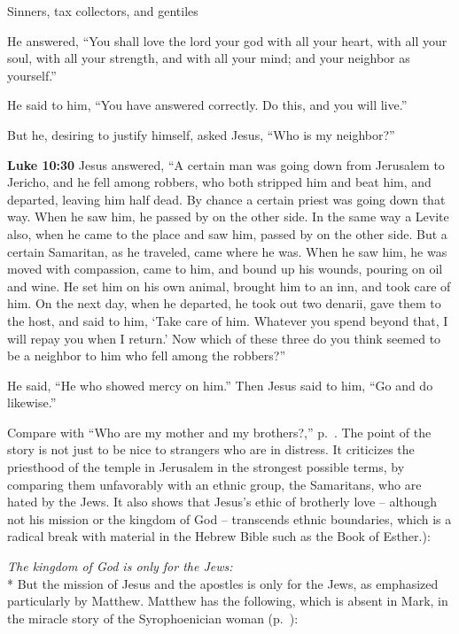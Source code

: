 \documentclass[10pt,twoside]{article} %
\newcommand{\doimage}[2]{\texttt{[image: \#2]}\label{fig:#2}}
\newcommand{\figbasic}[4]{ %
    \ifthenelse{\isodd{\pageref{fig:#2}}}{}{\hfill}
    \ifstrempty{#3}{
      \doimage{#1}{#2}
    }{
      \makebox{\doimage{#1}{#2} \\ #3}
    }
    \ifthenelse{\isodd{\pageref{fig:#2}}}{\hfill}{}
    \par
}
\newcommand{\fig}[2][0.4]{
  \figbasic{#1}{#2}{}{}
}
\newcommand{\quotesize}{\normalsize{}}
\newcommand{\comm}[1]{\begingroup \color{black!50} #1\endgroup}
\newenvironment{quotetext}{\begingroup\quotesize}{\endgroup}
\newcommand{\intex}[1]{\index[texts]{#1}}
\newcommand{\bible}[2]{\begin{quotetext}\textbf{#1}\intex{#1} #2\end{quotetext}}
\newcommand{\luke}[2]{\bible{Luke #1}{#2}}
\newcommand{\subhead}[1]{\emph{#1}\\*}
\begin{document}
\begin{section}{Sinners, tax collectors, and gentiles}
{  He answered, ``You shall love the lord your god with all your heart, with all your soul, with all your strength, and with all your mind; and your neighbor as yourself.''

  He said to him, ``You have answered correctly. Do this, and you will live.''

  But he, desiring to justify himself, asked Jesus, ``Who is my neighbor?''
}

\fig[1]{good-samaritan}


\luke{10:30}{
  Jesus answered, ``A certain man was going down from Jerusalem to Jericho, and he fell among robbers, who both stripped him and beat him, and departed, leaving him half dead.    By chance a certain priest was going down that way. When he saw him, he passed by on the other side.    In the same way a Levite also, when he came to the place and saw him, passed by on the other side.    But a certain Samaritan, as he traveled, came where he was. When he saw him, he was moved with compassion,    came to him, and bound up his wounds, pouring on oil and wine. He set him on his own animal, brought him to an inn, and took care of him.    On the next day, when he departed, he took out two denarii, gave them to the host, and said to him, `Take care of him. Whatever you spend beyond that, I will repay you when I return.'    Now which of these three do you think seemed to be a neighbor to him who fell among the robbers?''

  He said, ``He who showed mercy on him.''
Then Jesus said to him, ``Go and do likewise.'' 
}

\comm{Compare with ``Who are my mother and my brothers?,'' p.~\pageref{who-are-my-mother-and-my-brothers}.
The point of the story is not just to be nice to strangers who are in distress.
It criticizes the priesthood of the temple in Jerusalem in the strongest possible terms, by comparing them
unfavorably with an ethnic group, the Samaritans, who are hated by the Jews. It also shows that Jesus's ethic
of brotherly love -- although not his mission or the kingdom of God --
transcends ethnic boundaries, which is a radical break with material in the Hebrew Bible
such as the Book of Esther.):
}\label{gentile-evangelists-disagree}

\subhead{The kingdom of God is only for the Jews:}
\comm{
But the mission of Jesus and the apostles is only for the Jews, as emphasized particularly by Matthew.
Matthew has the following, which is absent in Mark, in the
miracle story of the Syrophoenician woman (p.~\pageref{canaanite-woman}):
}


\end{section}
\end{document}
